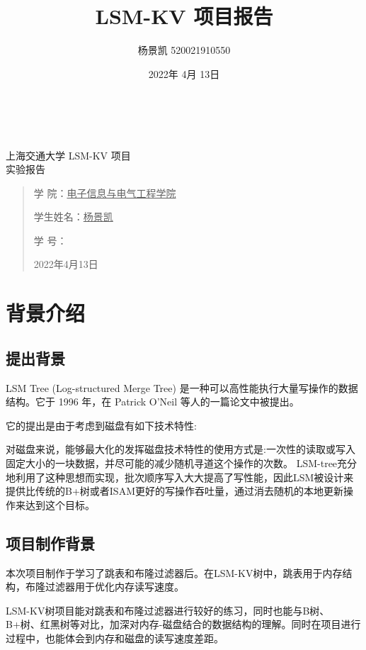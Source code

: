\documentclass[UTF8]{ctexart}
\title{LSM-KV 项目报告}
\author{杨景凯 520021910550}
\date{2022年 4月 13日}
\begin{document}
\begin{center}
    \quad \\
    \quad \\
    \kaishu \fontsize{45}{17} 上\quad 海\quad 交\quad 通\quad 大\quad 学
    \vskip 3.5cm
    \heiti {} LSM-KV 项目\\
    实验报告
\end{center}
\vskip 3.5cm
\begin{quotation}
    \songti \fontsize{30}{30}
    \doublespacing
    \par\setlength\parindent{12em}
    \quad 
\begin{center}
    学\hspace{0.61cm} 院：\underline{电子信息与电气工程学院}

    学生姓名：\underline{\qquad    \quad \quad 杨景凯    \quad  \quad\qquad }

    学\hspace{0.61cm} 号：\underline{\quad \quad{}\quad\quad}
\end{center}
    \centering
    2022年4月13日
\end{quotation}

\clearpage
\tableofcontents

\clearpage
\section{背景介绍}
\subsection{提出背景}
LSM Tree (Log-structured Merge Tree) 是一种可以高性能执行大量写操作的数据结构。它于 1996 年，在 Patrick O'Neil 等人的一篇论文中被提出。\cite{refpdf1}

它的提出是由于考虑到磁盘有如下技术特性:

对磁盘来说，能够最大化的发挥磁盘技术特性的使用方式是:一次性的读取或写入固定大小的一块数据，并尽可能的减少随机寻道这个操作的次数。
LSM-tree充分地利用了这种思想而实现，批次顺序写入大大提高了写性能，因此LSM被设计来提供比传统的B+树或者ISAM更好的写操作吞吐量，通过消去随机的本地更新操作来达到这个目标。\cite{refweb1}
\subsection{项目制作背景}
本次项目制作于学习了跳表和布隆过滤器后。在LSM-KV树中，跳表用于内存结构，布隆过滤器用于优化内存读写速度。

LSM-KV树项目能对跳表和布隆过滤器进行较好的练习，同时也能与B树、B+树、红黑树等对比，加深对内存-磁盘结合的数据结构的理解。同时在项目进行过程中，也能体会到内存和磁盘的读写速度差距。
\end{document}

